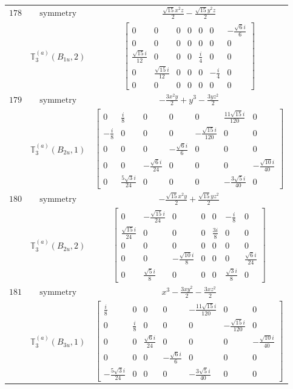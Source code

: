 \documentclass[fleqn,8pt,landscape]{jsarticle}
\begin{document}
\begin{longtable}{ccc}
$ 178 $ & $ \text{symmetry} $ & $ \frac{\sqrt{15} x^{2} z}{2} - \frac{\sqrt{15} y^{2} z}{2} $ \\
$  $ & $ \mathbb{T}_{3}^{(a)}(B_{1u},2) $ & $ \begin{bmatrix} 0 & 0 & 0 & 0 & 0 & 0 & - \frac{\sqrt{6} i}{6} \\ 0 & 0 & 0 & 0 & 0 & 0 & 0 \\ \frac{\sqrt{15} i}{12} & 0 & 0 & 0 & \frac{i}{4} & 0 & 0 \\ 0 & \frac{\sqrt{15} i}{12} & 0 & 0 & 0 & - \frac{i}{4} & 0 \\ 0 & 0 & 0 & 0 & 0 & 0 & 0 \end{bmatrix} $ \\ \hline
$ 179 $ & $ \text{symmetry} $ & $ - \frac{3 x^{2} y}{2} + y^{3} - \frac{3 y z^{2}}{2} $ \\
$  $ & $ \mathbb{T}_{3}^{(a)}(B_{2u},1) $ & $ \begin{bmatrix} 0 & \frac{i}{8} & 0 & 0 & 0 & \frac{11 \sqrt{15} i}{120} & 0 \\ - \frac{i}{8} & 0 & 0 & 0 & - \frac{\sqrt{15} i}{120} & 0 & 0 \\ 0 & 0 & 0 & - \frac{\sqrt{6} i}{6} & 0 & 0 & 0 \\ 0 & 0 & - \frac{\sqrt{6} i}{24} & 0 & 0 & 0 & - \frac{\sqrt{10} i}{40} \\ 0 & \frac{5 \sqrt{3} i}{24} & 0 & 0 & 0 & - \frac{3 \sqrt{5} i}{40} & 0 \end{bmatrix} $ \\ \hline
$ 180 $ & $ \text{symmetry} $ & $ - \frac{\sqrt{15} x^{2} y}{2} + \frac{\sqrt{15} y z^{2}}{2} $ \\
$  $ & $ \mathbb{T}_{3}^{(a)}(B_{2u},2) $ & $ \begin{bmatrix} 0 & - \frac{\sqrt{15} i}{24} & 0 & 0 & 0 & - \frac{i}{8} & 0 \\ \frac{\sqrt{15} i}{24} & 0 & 0 & 0 & \frac{3 i}{8} & 0 & 0 \\ 0 & 0 & 0 & 0 & 0 & 0 & 0 \\ 0 & 0 & - \frac{\sqrt{10} i}{8} & 0 & 0 & 0 & \frac{\sqrt{6} i}{24} \\ 0 & \frac{\sqrt{5} i}{8} & 0 & 0 & 0 & \frac{\sqrt{3} i}{8} & 0 \end{bmatrix} $ \\ \hline
$ 181 $ & $ \text{symmetry} $ & $ x^{3} - \frac{3 x y^{2}}{2} - \frac{3 x z^{2}}{2} $ \\
$  $ & $ \mathbb{T}_{3}^{(a)}(B_{3u},1) $ & $ \begin{bmatrix} \frac{i}{8} & 0 & 0 & 0 & - \frac{11 \sqrt{15} i}{120} & 0 & 0 \\ 0 & \frac{i}{8} & 0 & 0 & 0 & - \frac{\sqrt{15} i}{120} & 0 \\ 0 & 0 & \frac{\sqrt{6} i}{24} & 0 & 0 & 0 & - \frac{\sqrt{10} i}{40} \\ 0 & 0 & 0 & - \frac{\sqrt{6} i}{6} & 0 & 0 & 0 \\ - \frac{5 \sqrt{3} i}{24} & 0 & 0 & 0 & - \frac{3 \sqrt{5} i}{40} & 0 & 0 \end{bmatrix} $ \\ \hline

\end{longtable}
\end{document}
